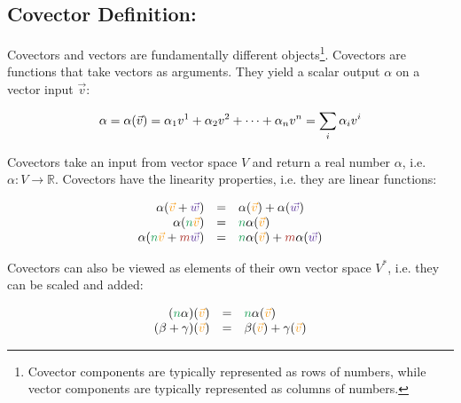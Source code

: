 \subsection{Covector Definition:}

Covectors and vectors are fundamentally different objects\footnote{Covector components are
typically represented as rows of numbers, while vector components are typically
represented as columns of numbers.}. Covectors are functions that take vectors as
arguments. They yield a scalar output $\alpha$ on a vector input $\vec{v}$:

\begin{equation}
    \alpha = \alpha(\vec{v}) = \alpha_1 v^1 + \alpha_2 v^2 + \dots + \alpha_n v^n =
    \sum\limits_{i}\alpha_i v^{i} 
\end{equation}

Covectors take an input from vector space $V$ and return a real number $\alpha$, i.e.
$\alpha: V \rightarrow \mathbb{R}$. Covectors have the linearity properties, i.e. they are
linear functions:

\begin{equation}
    \label{eq:covector_linearity}
    \begin{array}{rcl}
        \alpha(\textcolor{YellowOrange}{\vec{v}}+\textcolor{RoyalPurple}{\vec{w}}) & = &
        \alpha(\textcolor{YellowOrange}{\vec{v}})+\alpha(\textcolor{RoyalPurple}{\vec{w}}) \\
        \alpha(\textcolor{ForestGreen}{n}\textcolor{YellowOrange}{\vec{v}}) & = &
        \textcolor{ForestGreen}{n}\alpha(\textcolor{YellowOrange}{\vec{v}}) \\
        \alpha(\textcolor{ForestGreen}{n}\textcolor{YellowOrange}{\vec{v}}+
        \textcolor{Mahogany}{m}\textcolor{RoyalPurple}{\vec{w}}) & = &
        \textcolor{ForestGreen}{n}\alpha(\textcolor{YellowOrange}{\vec{v}})+
        \textcolor{Mahogany}{m}\alpha(\textcolor{RoyalPurple}{\vec{w}})
    \end{array}
\end{equation}

Covectors can also be viewed as elements of their own vector space $V^*$, i.e. they can be
scaled and added:

\begin{equation}
    \label{eq:covector_add_scale}
    \begin{array}{rcl}
        (\textcolor{ForestGreen}{n}\alpha)(\hdv) & = &
        \textcolor{ForestGreen}{n}\alpha(\hdv)\\
        (\beta + \gamma)(\hdv) & = &
        \beta(\hdv)+ \gamma(\hdv)
    \end{array}
\end{equation}

